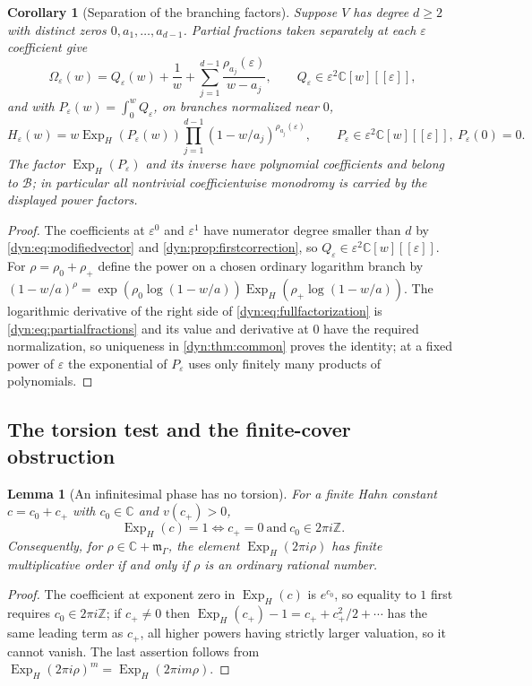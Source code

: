 \documentclass[11pt,letterpaper]{article}
\newtheorem{lemma}[lemma]{Lemma}
\newtheorem{corollary}[corollary]{Corollary}
\theoremstyle{definition}
\theoremstyle{remark}
\newcommand{\C}{\mathbb C}
\newcommand{\Z}{\mathbb Z}
\newcommand{\BB}{\mathscr B}
\newcommand{\m}{\mathfrak m}
\newcommand{\ExpH}{\operatorname{Exp}_{\!H}}
\newcommand{\eps}{\varepsilon}
\numberwithin{equation}{section}
\begin{document}
\begin{corollary}[Separation of the branching factors]
\label{dyn:cor:factorization}
Suppose $V$ has degree $d\ge2$ with distinct zeros $0,a_1,\dots,a_{d-1}$.
Partial fractions taken separately at each $\eps$ coefficient give
\begin{equation}\label{dyn:eq:partialfractions}
 \Omega_\eps(w)=Q_\eps(w)+\frac1w+\sum_{j=1}^{d-1}
 \frac{\rho_{a_j}(\eps)}{w-a_j},\qquad Q_\eps\in\eps^{2}\C[w][[\eps]],
\end{equation}
and with $P_\eps(w)=\int_0^{w}Q_\eps$, on branches normalized near $0$,
\begin{equation}\label{dyn:eq:fullfactorization}
 H_\eps(w)=w\ExpH(P_\eps(w))\prod_{j=1}^{d-1}(1-w/a_j)^{\rho_{a_j}(\eps)},
 \qquad P_\eps\in\eps^{2}\C[w][[\eps]],\ P_\eps(0)=0 .
\end{equation}
The factor $\ExpH(P_\eps)$ and its inverse have polynomial coefficients and
belong to $\BB$; in particular \emph{all} nontrivial coefficientwise
monodromy is carried by the displayed power factors.
\end{corollary}
\begin{proof}
The coefficients at $\eps^{0}$ and $\eps^{1}$ have numerator degree smaller
than $d$ by \eqref{dyn:eq:modifiedvector} and
\cref{dyn:prop:firstcorrection}, so $Q_\eps\in\eps^{2}\C[w][[\eps]]$. For
$\rho=\rho_0+\rho_+$ define the power on a chosen ordinary logarithm branch
by $(1-w/a)^{\rho}=\exp(\rho_0\log(1-w/a))\ExpH(\rho_+\log(1-w/a))$. The
logarithmic derivative of the right side of
\eqref{dyn:eq:fullfactorization} is \eqref{dyn:eq:partialfractions} and its
value and derivative at $0$ have the required normalization, so uniqueness
in \cref{dyn:thm:common} proves the identity; at a fixed power of $\eps$
the exponential of $P_\eps$ uses only finitely many products of
polynomials.
\end{proof}

\subsection{The torsion test and the finite-cover obstruction}

\begin{lemma}[An infinitesimal phase has no torsion]\label{dyn:lem:torsion}
For a finite Hahn constant $c=c_0+c_+$ with $c_0\in\C$ and $v(c_+)>0$,
\[
 \ExpH(c)=1\iff c_+=0\ \text{and}\ c_0\in2\pi i\Z .
\]
Consequently, for $\rho\in\C+\m_\Gamma$, the element $\ExpH(2\pi i\rho)$
has finite multiplicative order if and only if $\rho$ is an ordinary
\emph{rational} number.
\end{lemma}
\begin{proof}
The coefficient at exponent zero in $\ExpH(c)$ is $e^{c_0}$, so equality to
$1$ first requires $c_0\in2\pi i\Z$; if $c_+\ne0$ then
$\ExpH(c_+)-1=c_++c_+^{2}/2+\cdots$ has the same leading term as $c_+$, all
higher powers having strictly larger valuation, so it cannot vanish. The
last assertion follows from
$\ExpH(2\pi i\rho)^{m}=\ExpH(2\pi im\rho)$.
\end{proof}
\end{document}
